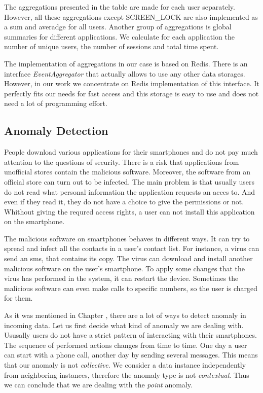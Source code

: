 The aggregations presented in the table are made for each user separately.
However, all these aggregations except SCREEN\_LOCK are also implemented as a sum and averadge for all users. 
Another group of aggregations is global summaries for different applications.
We calculate for each application the number of unique users, the number of sessions and total time spent. 

The implementation of aggregations in our case is based on Redis.
There is an interface \textit{EventAggregator} that actually allows to use any other data storages.
However, in our work we concentrate on Redis implementation of this interface.
It perfectly fits our needs for fast access and this storage is easy to use and does not need a lot of programming effort.

\subsection{Anomaly Detection}

People download various applications for their smartphones and do not pay much attention to the questions of security.
There is a risk that applications from unofficial stores contain the malicious software.
Moreover, the software from an official store can turn out to be infected.
The main problem is that usually users do not read what personal information the application requests an acces to.
And even if they read it, they do not have a choice to give the permissions or not.
Whithout giving the requred access rights, a user can not install this application on the smartphone.
   
The malicious software on smartphones behaves in different ways.
It can try to spread and infect all the contacts in a user's contact list.
For instance, a virus can send an sms, that contains its copy.
The virus can download and install another malicious software on the user's smartphone.
To apply some changes that the virus has performed in the system, it can restart the device.
Sometimes the malicious software can even make calls to specific numbers, so the user is charged for them.

As it was mentioned in Chapter , there are a lot of ways to detect anomaly in incoming data.
Let us first decide what kind of anomaly we are dealing with.
Ususally users do not have a strict pattern of interacting with their smartphones.
The sequence of performed actions changes from time to time.
One day a user can start with a phone call, another day by sending several messages.
This means that our anomaly is not \textit{collective}.
We consider a data instance independently from neighboring instances, therefore the anomaly type is not \textit{contextual}.
Thus we can conclude that we are dealing with the \textit{point} anomaly.

